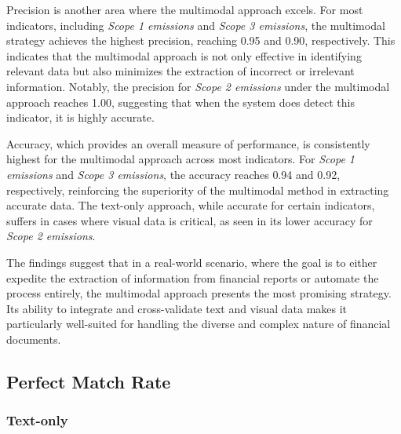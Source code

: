 \documentclass[english, 12pt, a4paper, elec, utf8, a-2b, online]{aaltothesis}
\begin{document}
Precision is another area where the multimodal approach excels.
For most indicators, including \textit{Scope 1 emissions} and \textit{Scope 3 emissions}, the multimodal strategy achieves the highest precision, reaching 0.95 and 0.90, respectively.
This indicates that the multimodal approach is not only effective in identifying relevant data but also minimizes the extraction of incorrect or irrelevant information.
Notably, the precision for \textit{Scope 2 emissions} under the multimodal approach reaches 1.00, suggesting that when the system does detect this indicator, it is highly accurate.

Accuracy, which provides an overall measure of performance, is consistently highest for the multimodal approach across most indicators.
For \textit{Scope 1 emissions} and \textit{Scope 3 emissions}, the accuracy reaches 0.94 and 0.92, respectively, reinforcing the superiority of the multimodal method in extracting accurate data.
The text-only approach, while accurate for certain indicators, suffers in cases where visual data is critical, as seen in its lower accuracy for \textit{Scope 2 emissions}.

The findings suggest that in a real-world scenario, where the goal is to either expedite the extraction of information from financial reports or automate the process entirely, the multimodal approach presents the most promising strategy.
Its ability to integrate and cross-validate text and visual data makes it particularly well-suited for handling the diverse and complex nature of financial documents.

\subsection{Perfect Match Rate}

\subsubsection{Text-only}
\end{document}
